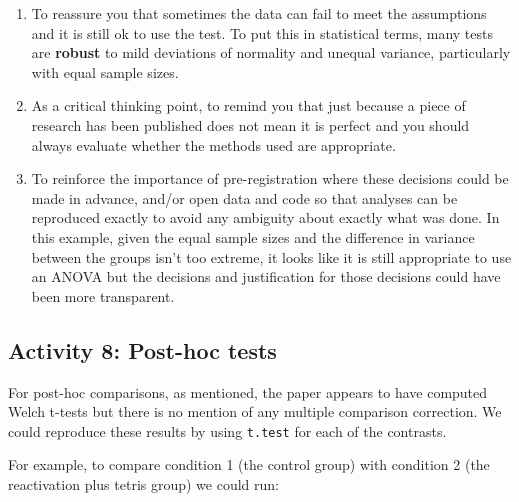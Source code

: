 \documentclass[]{book}
\newenvironment{Shaded}{\begin{snugshade}}{\end{snugshade}}
\newcommand{\DataTypeTok}[1]{\textcolor[rgb]{0.13,0.29,0.53}{#1}}
\newcommand{\KeywordTok}[1]{\textcolor[rgb]{0.13,0.29,0.53}{\textbf{#1}}}
\newcommand{\NormalTok}[1]{#1}
\newcommand{\OperatorTok}[1]{\textcolor[rgb]{0.81,0.36,0.00}{\textbf{#1}}}
\newcommand{\StringTok}[1]{\textcolor[rgb]{0.31,0.60,0.02}{#1}}
\providecommand{\tightlist}{%
  \setlength{\itemsep}{0pt}\setlength{\parskip}{0pt}}
\begin{document}
\begin{enumerate}
\def\labelenumi{\arabic{enumi}.}
\tightlist
\item
  To reassure you that sometimes the data can fail to meet the assumptions and it is still ok to use the test. To put this in statistical terms, many tests are \textbf{robust} to mild deviations of normality and unequal variance, particularly with equal sample sizes.
\item
  As a critical thinking point, to remind you that just because a piece of research has been published does not mean it is perfect and you should always evaluate whether the methods used are appropriate.
\item
  To reinforce the importance of pre-registration where these decisions could be made in advance, and/or open data and code so that analyses can be reproduced exactly to avoid any ambiguity about exactly what was done. In this example, given the equal sample sizes and the difference in variance between the groups isn't too extreme, it looks like it is still appropriate to use an ANOVA but the decisions and justification for those decisions could have been more transparent.
\end{enumerate}

\hypertarget{activity-8-post-hoc-tests}{%
\subsection{Activity 8: Post-hoc tests}\label{activity-8-post-hoc-tests}}

For post-hoc comparisons, as mentioned, the paper appears to have computed Welch t-tests but there is no mention of any multiple comparison correction. We could reproduce these results by using \texttt{t.test} for each of the contrasts.

For example, to compare condition 1 (the control group) with condition 2 (the reactivation plus tetris group) we could run:

\begin{Shaded}
\end{Shaded}
\end{document}
